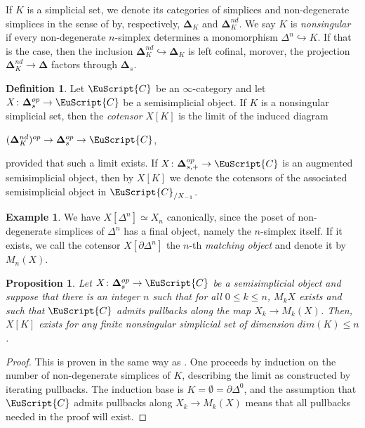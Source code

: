 \documentclass[oneside,a4paper]{amsart}
\newcommand{\euscr}[1]{\EuScript{#1}} %
\newcommand{\ccat}{\euscr{C}} %
\newcommand{\thickdelta}{\mathbf{\Delta}} %
\theoremstyle{plain}
\newtheorem{prop}[thm]{Proposition}
\theoremstyle{definition}
\newtheorem{example}[thm]{Example}
\newtheorem{defin}[thm]{Definition}
\theoremstyle{remark}
\begin{document}
If $K$ is a simplicial set, we denote its categories of simplices and non-degenerate simplices in the sense of \cite[\S5.9]{dwyer1997model} by, respectively, $\thickdelta_{K}$ and $\thickdelta_{K}^{nd}$. We say $K$ is \emph{nonsingular} if every non-degenerate $n$-simplex determines a monomorphism $\Delta^{n} \hookrightarrow K$. If that is the case, then the inclusion $\thickdelta_{K}^{nd} \hookrightarrow \thickdelta_{K}$ is left cofinal, morover, the projection $\thickdelta_{K}^{nd} \rightarrow \thickdelta$ factors through $\thickdelta_{s}$. 
\begin{defin}
Let $\ccat$ be an $\infty$-category and let $X \colon \thickdelta_{s}^{op} \rightarrow \ccat$ be a semisimplicial object. If $K$ is a nonsingular simplicial set, then the \emph{cotensor} $X[K]$ is the limit of the induced diagram 

\begin{center}
$(\thickdelta^{nd}_{K})^{op} \rightarrow \thickdelta_{s}^{op} \rightarrow \ccat$,
\end{center}
provided that such a limit exists. If $X \colon \thickdelta_{s, +}^{op} \rightarrow \ccat$ is an augmented semisimplicial object, then by $X[K]$ we denote the cotensors of the associated semisimplicial object in $\ccat _{/ X_{-1}}$. 
\end{defin}

\begin{example}
We have $X[\Delta^{n}] \simeq X_{n}$ canonically, since the poset of non-degenerate simplices of $\Delta^{n}$ has a final object, namely the $n$-simplex itself. If it exists, we call the cotensor $X[\partial \Delta^{n}]$ the $n$-th \emph{matching object} and denote it by $M_{n}(X)$. 
\end{example}

\begin{prop}
\label{prop:existence_of_cotensors_along_a_finite_set}
Let $X \colon \thickdelta_{s}^{op} \rightarrow \ccat$ be a semisimplicial object and suppose that there is an integer $n$ such that for all $0 
\leq k \leq n$, $M_{k}X$ exists and such that $\ccat$ admits pullbacks along the map $X_{k} \rightarrow M_{k}(X)$. Then, $X[K]$ exists for any finite nonsingular simplicial set of dimension $dim(K) \leq n$.
\end{prop}

\begin{proof}
This is proven in the same way as \cite[4.4.2.4]{lurie_higher_topos_theory}. One proceeds by induction on the number of non-degenerate simplices of $K$, describing the limit as constructed by iterating pullbacks. The induction base is $K = \emptyset = \partial \Delta^{0}$, and the assumption that $\ccat$ admits pullbacks along $X_{k} \rightarrow M_{k}(X)$ means that all pullbacks needed in the proof will exist. 
\end{proof}
\end{document}
